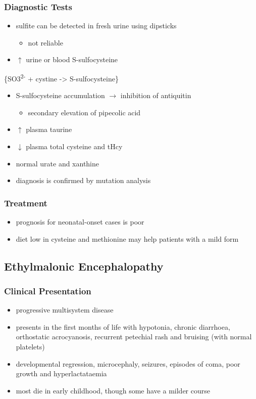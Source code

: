 \documentclass{scrartcl}
\begin{document}
\subsubsection{Diagnostic Tests}
\label{sec:org68c5e89}
\begin{itemize}
\item sulfite can be detected in fresh urine using dipsticks
\begin{itemize}
\item not reliable
\end{itemize}
\item \(\uparrow\) urine or blood S-sulfocysteine
\end{itemize}
\ce\{SO3\textsuperscript{2-} + cystine -> S-sulfocysteine\}
\begin{itemize}
\item S-sulfocysteine accumulation \(\to\) inhibition of antiquitin
\begin{itemize}
\item secondary elevation of pipecolic acid
\end{itemize}
\end{itemize}
\begin{itemize}
\item \(\uparrow\) plasma taurine
\item \(\downarrow\) plasma total cysteine and tHcy
\item normal urate and xanthine
\item diagnosis is confirmed by mutation analysis
\end{itemize}

\subsubsection{Treatment}
\label{sec:org029be88}
\begin{itemize}
\item prognosis for neonatal-onset cases is poor
\item diet low in cysteine and methionine may help patients with a mild
form
\end{itemize}

\subsection{Ethylmalonic Encephalopathy}
\label{sec:orgc7f832c}
\subsubsection{Clinical Presentation}
\label{sec:orgb74d0d2}
\begin{itemize}
\item progressive multisystem disease
\item presents in the first months of life with hypotonia, chronic
diarrhoea, orthostatic acrocyanosis, recurrent petechial rash and
bruising (with normal platelets)
\item developmental regression, microcephaly, seizures, episodes of coma,
poor growth and hyperlactataemia
\item most die in early childhood, though some have a milder course
\end{itemize}
\end{document}
